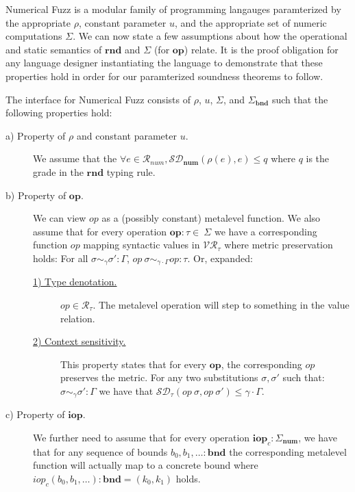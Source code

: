 Numerical Fuzz is a modular family of programming langauges paramterized by the
appropriate $\rho$, constant parameter $u$, and the appropriate set of numeric
computations $\Sigma$.  
We can now state a few assumptions about how the operational and static
semantics of $\mathbf{rnd}$ and $\Sigma$ (for $\mathbf{op}$) relate.
It is the proof obligation for any language designer instantiating the language
to demonstrate that these properties hold in order for our paramterized
soundness theorems to follow.
\begin{definition}
  \label{def:numfuzz-interface}
  The interface for Numerical Fuzz consists of $\rho$, $u$, $\Sigma$, and
  $\Sigma_{\mathbf{bnd}}$ such that the following properties hold: 
\begin{description}
  \item[a) Property of $\rho$ and constant parameter $u$.] We assume that the
    $\forall e \in \mathcal{R}_{num}, \mathcal{SD}_{\mathbf{num}}(\rho(e), e)
    \leq q$ where $q$ is the grade in the $\mathbf{rnd}$ typing rule.
  \item[b) Property of $\mathbf{op}$.] 
    We can view $\textit{op}$ as a (possibly constant) metalevel function.
    We also assume that for every operation
    $\mathbf{op} : \tau \in \ \Sigma$ we have a
    corresponding function $op$ mapping syntactic values in
    $\mathcal{VR}_{\tau}$ where metric preservation holds: For all $\sigma
    \sim_{\gamma} \sigma' : \Gamma$, $\textit{op}~\sigma \sim_{\gamma \cdot
    \Gamma} \textit{op} : \tau$.
    Or, expanded:
    \begin{description}
      \item[\underline{1) Type denotation.}] $\mathit{op} \in
        \mathcal{R}_{\tau}$. The metalevel operation will step to something in the
        value relation.
      \item[\underline{2) Context sensitivity.}]
        This property states that for every $\textbf{op}$, the
        corresponding $\textit{op}$ preserves the metric. For any two
        substitutions $\sigma, \sigma'$ such that:
        $\sigma \sim_{\gamma} \sigma' : \Gamma$
        we have that
        $\mathcal{SD}_{\tau}(\textit{op}~\sigma, \textit{op}~\sigma') \leq \gamma \cdot \Gamma$.
    \end{description} \item[c) Property of $\mathbf{iop}$.] We further need to
      assume that for every operation $\mathbf{iop}_c : \Sigma_\textbf{num}$, we
      have that for any sequence of bounds $b_0, b_1, \ldots : \textbf{bnd}$ the
      corresponding metalevel function will actually map to a concrete bound
      where $\textit{iop}_c(b_0, b_1, \ldots) : \textbf{bnd} = (k_0, k_1)$
      holds.
\end{description}
\end{definition}

